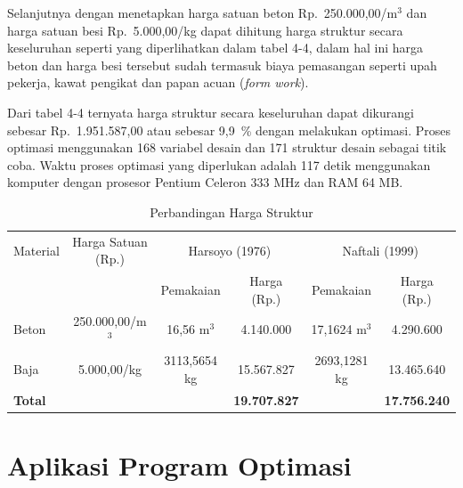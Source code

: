 Selanjutnya dengan menetapkan harga satuan beton Rp.\ 250.000,00/m$^3$ dan
harga satuan besi Rp.\ 5.000,00/kg dapat dihitung harga struktur secara
keseluruhan seperti yang diperlihatkan dalam tabel 4-4, dalam hal ini
harga beton dan harga besi tersebut sudah termasuk biaya pemasangan
seperti upah pekerja, kawat pengikat dan papan acuan (\textit{form
work}).

Dari tabel 4-4 ternyata harga struktur secara keseluruhan dapat dikurangi
sebesar Rp.\ 1.951.587,00 atau sebesar 9,9~\% dengan melakukan optimasi.
Proses optimasi menggunakan 168 variabel desain dan 171 struktur desain
sebagai titik coba. Waktu proses optimasi yang diperlukan adalah 117
detik menggunakan komputer dengan prosesor Pentium Celeron 333 MHz dan
RAM 64 MB.

\begin{table}[htbp]
\centering
\caption{Perbandingan Harga Struktur}
\label{tab:4-4}
\begin{tabular}{lccccc}
\toprule
Material & Harga Satuan (Rp.) & \multicolumn{2}{c}{Harsoyo (1976)} & \multicolumn{2}{c}{Naftali (1999)} \\
\cmidrule(lr){3-4}\cmidrule(lr){5-6}
 & & Pemakaian & Harga (Rp.) & Pemakaian & Harga (Rp.) \\
\midrule
Beton & 250.000,00/m$^3$ & 16,56 m$^3$ & 4.140.000 & 17,1624 m$^3$ & 4.290.600 \\
Baja  & 5.000,00/kg      & 3113,5654 kg & 15.567.827 & 2693,1281 kg & 13.465.640 \\
\midrule
\textbf{Total} & & & \textbf{19.707.827} & & \textbf{17.756.240} \\
\bottomrule
\end{tabular}
\end{table}

\section{Aplikasi Program Optimasi}

